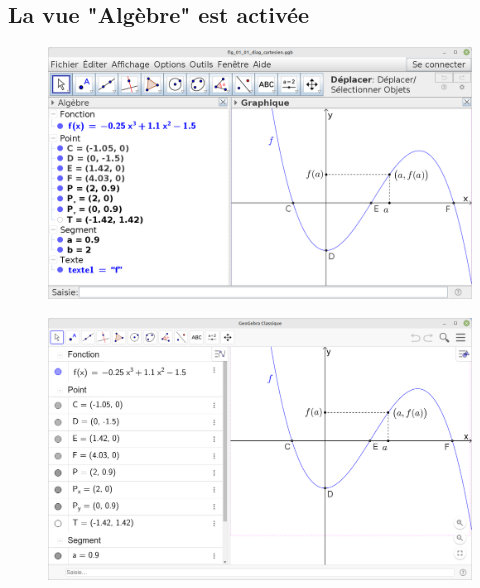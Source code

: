 \documentclass[10pt,a4paper]{report}
\begin{document}
\subsection{La vue "Algèbre" est activée}

\begin{minipage}{.48\linewidth}
	\begin{figure}[H]
		\centering
		\includegraphics[width=\linewidth]{captures/interface_geogebra}
		\caption{}
		\label{fig:interface_geogebra}
	\end{figure}
\end{minipage}
\hfill
\begin{minipage}{.48\linewidth}
	\begin{figure}[H]
		\centering
		\includegraphics[width=\linewidth]{captures/interface_geogebra_classic}
		\caption{}
		\label{fig:interface_geogebra_classic}
	\end{figure}
\end{minipage}
\end{document}

